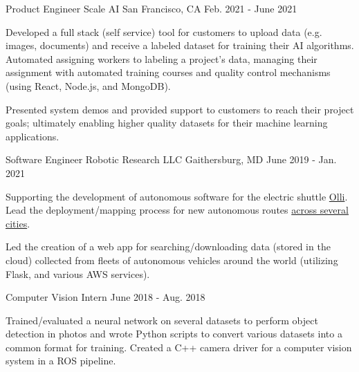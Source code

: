 
\begin{cventries}
  \cventry
    {Product Engineer} %
    {Scale AI} %
    {San Francisco, CA} %
    {Feb. 2021 - June 2021} %
    {
      \begin{cvitems} %
      \item {Developed a full stack (self service) tool for customers to upload data (e.g. images, documents) and receive a labeled dataset for training their AI algorithms.  Automated assigning workers to labeling a project's data, managing their assignment with automated training courses and quality control mechanisms (using React, Node.js, and MongoDB).}
        \item {Presented system demos and provided support to customers to reach their project goals; ultimately enabling higher quality datasets for their machine learning applications.}
      \end{cvitems}
    }

  \cventry
    {Software Engineer} %
    {Robotic Research LLC} %
    {Gaithersburg, MD} %
    {June 2019 - Jan. 2021} %
    {
      \begin{cvitems} %
        \item {Supporting the development of autonomous software for the electric 
          shuttle \href{https://localmotors.com/olli}{Olli}.  Lead the deployment/mapping process for new autonomous routes \href{https://localmotors.com/deployments}{across several cities}.}
      \item {Led the creation of a web app for searching/downloading data (stored in the cloud) collected from fleets of autonomous vehicles around the world (utilizing Flask, and various AWS services).}
      \end{cvitems}
    }

  \cventry
    {Computer Vision Intern} %
    {} %
    {} %
    {June 2018 - Aug. 2018} %
    {
      \begin{cvitems} %
        \item {Trained/evaluated a neural network on several datasets to perform object detection in 
photos and wrote Python scripts to convert various datasets into a common format for 
training.  Created a C++ camera driver for a computer vision system in a ROS pipeline.}
      \end{cvitems}
    }


\end{cventries}
